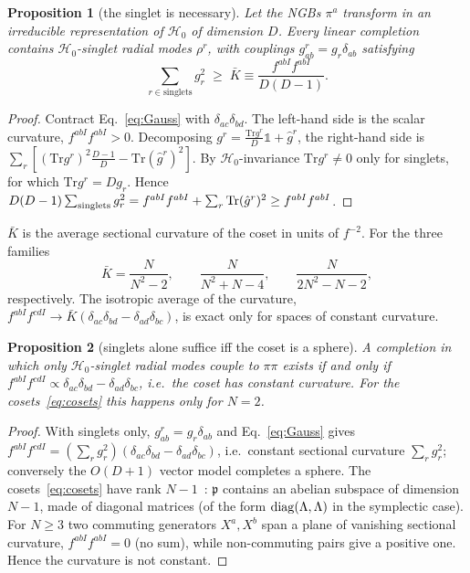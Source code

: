 \documentclass[aps,prd,twocolumn,superscriptaddress,nofootinbib,floatfix]{revtex4-2}
\newtheorem{proposition}{Proposition}
\theoremstyle{remark}
\newcommand{\Tr}{\mathrm{Tr}}
\newcommand{\Hg}{\mathcal{H}_0}    %
\newcommand{\p}{\mathfrak{p}}
\newcommand{\ie}{i.e.}
\begin{document}
\begin{proposition}[the singlet is necessary]
\label{prop:singlet}
Let the NGBs $\pi^a$ transform in an irreducible representation of $\Hg$ of dimension $D$. Every linear completion contains $\Hg$-singlet radial modes $\rho^r$, with couplings $g^r_{ab}=g_r\delta_{ab}$ satisfying
\begin{equation}
\sum_{r\in\text{singlets}}g_r^2\;\geq\;\bar K\equiv\frac{f^{abI}f^{abI}}{D(D-1)} .
\label{eq:singletbound}
\end{equation}
\end{proposition}
\begin{proof}
Contract Eq.~\eqref{eq:Gauss} with $\delta_{ac}\delta_{bd}$. The left-hand side is the scalar curvature, $f^{abI}f^{abI}>0$. Decomposing $g^r=\frac{\Tr g^r}{D}\mathbb{1}+\hat g^r$, the right-hand side is $\sum_r[(\Tr g^r)^2\frac{D-1}{D}-\Tr(\hat g^r)^2]$. By $\Hg$-invariance $\Tr g^r\neq0$ only for singlets, for which $\Tr g^r=Dg_r$. Hence $D(D-1)\sum_{\rm singlets}g_r^2=f^{abI}f^{abI}+\sum_r\Tr(\hat g^r)^2\geq f^{abI}f^{abI}$.
\end{proof}
$\bar K$ is the average sectional curvature of the coset in units of $f^{-2}$. For the three families
\begin{equation}
\bar K=\frac{N}{N^2-2},\qquad \frac{N}{N^2+N-4},\qquad \frac{N}{2N^2-N-2},
\label{eq:Kbar}
\end{equation}
respectively. The isotropic average of the curvature, $f^{abI}f^{cdI}\to\bar K(\delta_{ac}\delta_{bd}-\delta_{ad}\delta_{bc})$, is exact only for spaces of constant curvature.

\begin{proposition}[singlets alone suffice iff the coset is a sphere]
\label{prop:sphere}
A completion in which only $\Hg$-singlet radial modes couple to $\pi\pi$ exists if and only if $f^{abI}f^{cdI}\propto\delta_{ac}\delta_{bd}-\delta_{ad}\delta_{bc}$, \ie\ the coset has constant curvature. For the cosets~\eqref{eq:cosets} this happens only for $N=2$.
\end{proposition}
\begin{proof}
With singlets only, $g^r_{ab}=g_r\delta_{ab}$ and Eq.~\eqref{eq:Gauss} gives $f^{abI}f^{cdI}=(\sum_rg_r^2)(\delta_{ac}\delta_{bd}-\delta_{ad}\delta_{bc})$, \ie\ constant sectional curvature $\sum_r g_r^2$; conversely the $O(D+1)$ vector model completes a sphere. The cosets~\eqref{eq:cosets} have rank $N-1$~\cite{Helgason}: $\p$ contains an abelian subspace of dimension $N-1$, made of diagonal matrices (of the form ${\rm diag}(\Lambda,\Lambda)$ in the symplectic case). For $N\geq3$ two commuting generators $X^a,X^b$ span a plane of vanishing sectional curvature, $f^{abI}f^{abI}=0$ (no sum), while non-commuting pairs give a positive one. Hence the curvature is not constant.
\end{proof}
\end{document}
